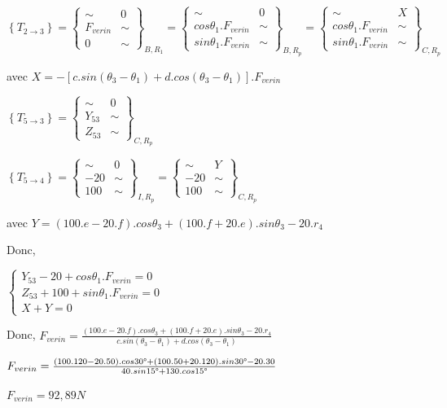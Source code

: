 $\left\{T_{2\rightarrow 3}\right\}=\left\{
\begin{array}{cc}
\sim & 0 \\
F_{verin} & \sim \\
0 & \sim
\end{array}
\right\}_{B,R_1}=\left\{
\begin{array}{cc}
\sim & 0 \\
cos\theta_1.F_{verin}  & \sim \\
sin\theta_1.F_{verin}  & \sim
\end{array}
\right\}_{B,R_p}=\left\{
\begin{array}{cc}
\sim & X \\
cos\theta_1.F_{verin} & \sim \\
sin\theta_1.F_{verin} & \sim
\end{array}
\right\}_{C,R_p}$

avec $X=-\left[c.sin(\theta_3-\theta_1)+d.cos(\theta_3-\theta_1)\right].F_{verin}$

$\left\{T_{5\rightarrow 3}\right\}=\left\{
\begin{array}{cc}
\sim & 0 \\
Y_{53} & \sim \\
Z_{53} & \sim
\end{array}
\right\}_{C,R_p}$

$\left\{T_{5\rightarrow 4}\right\}=\left\{
\begin{array}{cc}
\sim & 0 \\
-20 & \sim \\
100 & \sim
\end{array}
\right\}_{I,R_p}=\left\{
\begin{array}{cc}
\sim & Y \\
-20 & \sim \\
100 & \sim
\end{array}
\right\}_{C,R_p}$

avec $Y=(100.e-20.f).cos\theta_3+(100.f+20.e).sin\theta_3-20.r_4$

Donc,

$\left\{\begin{array}{l}
Y_{53}-20+cos\theta_1.F_{verin}=0 \\
Z_{53}+100+sin\theta_1.F_{verin}=0 \\
X+Y=0
\end{array}\right.$

Donc, $F_{verin}=\frac{(100.e-20.f).cos\theta_3+(100.f+20.e).sin\theta_3-20.r_4}{c.sin(\theta_3-\theta_1)+d.cos(\theta_3-\theta_1)}$

$F_{verin}=\frac{(100.120-20.50).cos30\degree+(100.50+20.120).sin30\degree-20.30}{40.sin15\degree+130.cos15\degree}$

$F_{verin}=92,89N$


